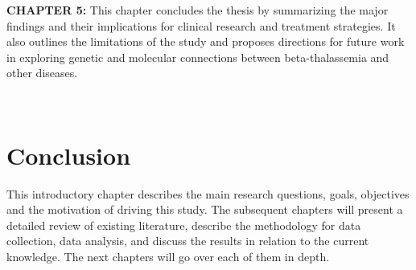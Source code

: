 \vspace{0.2cm}

\textbf{CHAPTER 5:} 
This chapter concludes the thesis by summarizing the major findings and their implications for clinical research and treatment strategies. It also outlines the limitations of the study and proposes directions for future work in exploring genetic and molecular connections between beta-thalassemia and other diseases.

\vspace{0.2cm}

\
\section{Conclusion}
\label{sec:sec1_5}

\space This introductory chapter describes the main research questions, goals, objectives and the motivation of driving this study. The subsequent chapters will present a detailed review of existing literature, describe the methodology for data collection, data analysis, and discuss the results in relation to the current knowledge. The next chapters will go over each of them in depth.
